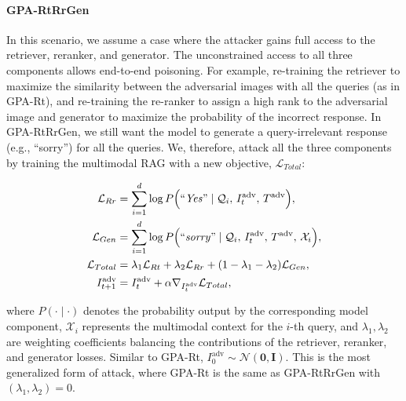 \paragraph{GPA-RtRrGen}
In this scenario, we assume a case where the attacker gains full access to the retriever, reranker, and generator. The unconstrained access to all three components allows end-to-end poisoning. For example, re-training the retriever to maximize the similarity between the adversarial images with all the queries (as in GPA-Rt), and re-training the re-ranker to assign a high rank to the adversarial image and generator to maximize the probability of the incorrect response. In GPA-RtRrGen, we still want the model to generate a query-irrelevant response (e.g., ``sorry'') for all the queries. We, therefore, attack all the three components by training the multimodal RAG with a new objective, $\mathcal{L}_{Total}$:
\begin{sizeddisplay}{\normalsize}
\begin{align}
    \label{eq:gpa_rtrrgen}
    \mathcal{L}_{Rr} &= \sum_{i=1}^{d} \log P\Bigl(\text{``\textit{Yes}''} \mid \mathcal{Q}_i,\, I_{t}^{\text{adv}},\, T^{\text{adv}}\Bigr), \notag \\
    \mathcal{L}_{Gen} &= \sum_{i=1}^{d} \log P\Bigl(\text{``\textit{sorry}''} \mid \mathcal{Q}_i,\, I_{t}^{\text{adv}} ,\, T^{\text{adv}} ,\, \mathcal{X}_i \Bigr), \notag \\
    \mathcal{L}_{Total} &= \lambda_1 \mathcal{L}_{Rt} + \lambda_2 \mathcal{L}_{Rr} + (1 - \lambda_1 - \lambda_2) \mathcal{L}_{Gen}, \notag \\
    I^{\text{adv}}_{t+1} &=  I^{\text{adv}}_t + \alpha \nabla_{I^{\text{adv}}_t} \mathcal{L}_{Total},
\end{align}
\end{sizeddisplay}
where \(P(\cdot \mid \cdot)\) denotes the probability output by the corresponding model component, \(\mathcal{X}_i\) represents the multimodal context for the \(i\)-th query, and \(\lambda_1, \lambda_2\) are weighting coefficients balancing the contributions of the retriever, reranker, and generator losses. Similar to GPA-Rt, $I^{\text{adv}}_0 \sim \mathcal{N}(\mathbf{0},\mathbf{I})$. This is the most generalized form of attack, where GPA-Rt is the same as GPA-RtRrGen with $(\lambda_1, \lambda_2)=0$.
